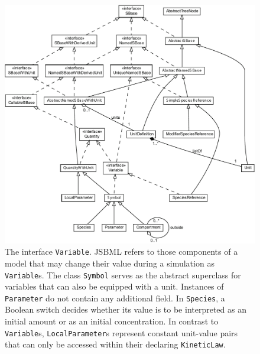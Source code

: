 \begin{figure}[p]
 \centering
 \includegraphics[width=\textwidth]{img/Symbol.pdf}
 \caption[The interface \texttt{Variable}]{The interface \texttt{Variable}.
 JSBML refers to those components of a model that may change their value during
 a simulation as \texttt{Variable}s. The class \texttt{Symbol} serves as the
 abstract superclass for variables that can also be equipped with a unit.
 Instances of \texttt{Parameter} do not contain any additional field. In
 \texttt{Species}, a Boolean switch decides whether its value is to be
 interpreted as an initial amount or as an initial concentration. In contrast
 to \texttt{Variable}s, \texttt{LocalParameter}s represent constant unit-value
 pairs that can only be accessed within their declaring
 \texttt{KineticLaw}.}
 \label{fig:Variable}
\end{figure}
